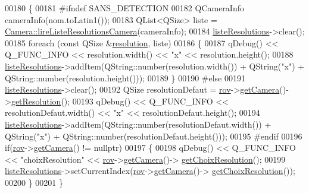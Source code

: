 \begin{DoxyCode}
00180 \{
00181 \textcolor{preprocessor}{    #ifndef SANS\_DETECTION}
00182     QCameraInfo cameraInfo(nom.toLatin1());
00183     QList<QSize> liste = \hyperlink{class_camera_ac4756add4cb6bef60e38f3da79c2383f}{Camera::lireListeResolutionsCamera}(cameraInfo);
00184     \hyperlink{class_i_h_m_reglage_video_ad897355a4350d95f5f219db57ff68d4f}{listeResolutions}->clear();
00185     \textcolor{keywordflow}{foreach} (\textcolor{keyword}{const} QSize &\hyperlink{class_i_h_m_reglage_video_a7fd79309e9501b8cb340ae61b96c0366}{resolution}, liste)
00186     \{
00187         qDebug() << Q\_FUNC\_INFO << resolution.width() << \textcolor{stringliteral}{"x"} << resolution.height();
00188         \hyperlink{class_i_h_m_reglage_video_ad897355a4350d95f5f219db57ff68d4f}{listeResolutions}->addItem(QString::number(resolution.width()) + QString(\textcolor{stringliteral}{"x"}) + 
      QString::number(resolution.height()));
00189     \}
00190 \textcolor{preprocessor}{    #else}
00191     \hyperlink{class_i_h_m_reglage_video_ad897355a4350d95f5f219db57ff68d4f}{listeResolutions}->clear();
00192     QSize resolutionDefaut = \hyperlink{class_i_h_m_reglage_video_a755736fe361e651453de6bc21725a626}{rov}->\hyperlink{class_rov_ac1eeb568d39018359b89384c2ee6ee86}{getCamera}()->\hyperlink{class_camera_a9fae9d9b6fa352ff96c9874d9b085454}{getResolution}();
00193     qDebug() << Q\_FUNC\_INFO << resolutionDefaut.width() << \textcolor{stringliteral}{"x"} << resolutionDefaut.height();
00194     \hyperlink{class_i_h_m_reglage_video_ad897355a4350d95f5f219db57ff68d4f}{listeResolutions}->addItem(QString::number(resolutionDefaut.width()) + QString(\textcolor{stringliteral}{"x"}) + 
      QString::number(resolutionDefaut.height()));
00195 \textcolor{preprocessor}{    #endif}
00196     \textcolor{keywordflow}{if}(\hyperlink{class_i_h_m_reglage_video_a755736fe361e651453de6bc21725a626}{rov}->\hyperlink{class_rov_ac1eeb568d39018359b89384c2ee6ee86}{getCamera}() != \textcolor{keyword}{nullptr})
00197     \{
00198         qDebug() << Q\_FUNC\_INFO << \textcolor{stringliteral}{"choixResolution"} << \hyperlink{class_i_h_m_reglage_video_a755736fe361e651453de6bc21725a626}{rov}->\hyperlink{class_rov_ac1eeb568d39018359b89384c2ee6ee86}{getCamera}()->
      \hyperlink{class_camera_ab9f05b05c29416dce6471b5a03db98ea}{getChoixResolution}();
00199         \hyperlink{class_i_h_m_reglage_video_ad897355a4350d95f5f219db57ff68d4f}{listeResolutions}->setCurrentIndex(\hyperlink{class_i_h_m_reglage_video_a755736fe361e651453de6bc21725a626}{rov}->\hyperlink{class_rov_ac1eeb568d39018359b89384c2ee6ee86}{getCamera}()->
      \hyperlink{class_camera_ab9f05b05c29416dce6471b5a03db98ea}{getChoixResolution}());
00200     \}
00201 \}
\end{DoxyCode}
\mbox{\label{class_i_h_m_reglage_video_a2e51529e3a822121ae999e13da2180c6}} 
